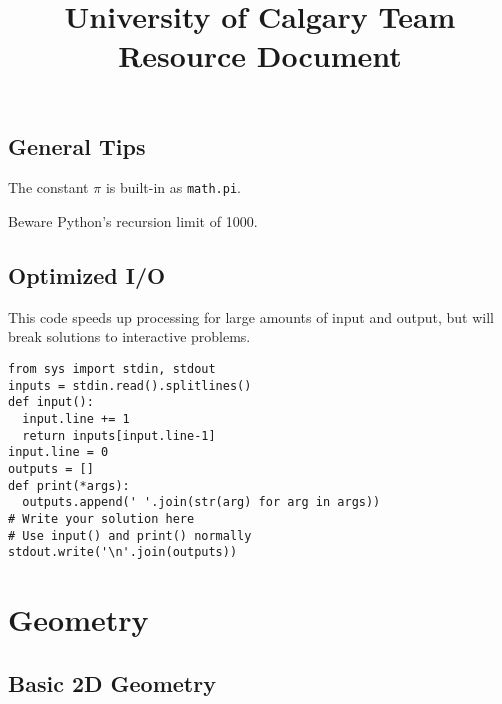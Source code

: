 \documentclass[letterpaper]{article}
\begin{document}
\title{University of Calgary Team Resource Document}
\maketitle
\thispagestyle{myheadings}

\begin{multicols*}{2}

    \tableofcontents

    \section{General Tips}
    The constant $\pi$ is built-in as \texttt{math.pi}.

    Beware Python's recursion limit of 1000.
    \subsection{Optimized I/O}
    This code speeds up processing for large amounts of input and output, but will
    break solutions to interactive problems.
    \begin{lstlisting}
from sys import stdin, stdout
inputs = stdin.read().splitlines()
def input():
  input.line += 1
  return inputs[input.line-1]
input.line = 0
outputs = []
def print(*args):
  outputs.append(' '.join(str(arg) for arg in args))
# Write your solution here
# Use input() and print() normally
stdout.write('\n'.join(outputs))
\end{lstlisting}

\end{multicols*}

\section{Geometry}

\subsection{Basic 2D Geometry}
\end{document}
